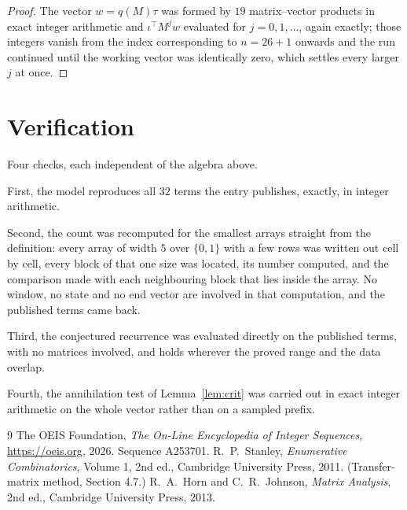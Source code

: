 \documentclass[11pt,a4paper]{article}
\theoremstyle{plain}
\theoremstyle{definition}
\begin{document}
\begin{proof}
The vector $w=q(M)\tau$ was formed by $19$ matrix--vector products in exact integer
arithmetic and $\iota^{\!\top}M^{j}w$ evaluated for $j=0,1,\dots$, again exactly; those
integers vanish from the index corresponding to $n=26+1$ onwards and the run continued
until the working vector was identically zero, which settles every larger $j$ at once.
\end{proof}

\section{Verification}

Four checks, each independent of the algebra above.

First, the model reproduces all $32$ terms the entry publishes, exactly, in integer
arithmetic.

Second, the count was recomputed for the smallest arrays straight from the definition: every
array of width $5$ over $\{0,1\}$ with a few rows was written out cell by cell, every block of
that one size was located, its number computed, and the comparison made with each neighbouring block
that lies inside the array. No window, no state and no end vector are involved in that
computation, and the published terms came back.

Third, the conjectured recurrence was evaluated directly on the published terms, with no
matrices involved, and holds wherever the proved range and the data overlap.

Fourth, the annihilation test of Lemma~\ref{lem:crit} was carried out in exact integer
arithmetic on the whole vector rather than on a sampled prefix.

\begin{thebibliography}{9}
 The OEIS Foundation, \emph{The On-Line Encyclopedia of Integer
Sequences}, \url{https://oeis.org}, 2026. Sequence A253701.
 R.~P.~Stanley, \emph{Enumerative Combinatorics}, Volume 1, 2nd ed.,
Cambridge University Press, 2011. (Transfer-matrix method, Section 4.7.)
 R.~A.~Horn and C.~R.~Johnson, \emph{Matrix Analysis}, 2nd ed., Cambridge
University Press, 2013.
\end{thebibliography}
\end{document}
